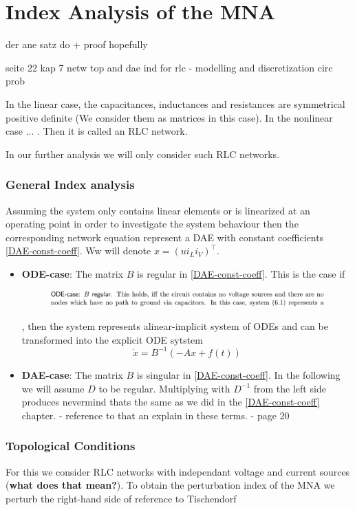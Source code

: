 \chapter{Index Analysis of the MNA}

der ane satz do + proof hopefully

seite 22 kap 7 netw top and dae ind for rlc - modelling and discretization circ prob

In the linear case, the capacitances, inductances and resistances are symmetrical positive definite (We consider them as matrices in this case). In the nonlinear case ... . Then it is called an RLC network.

In our further analysis we will only consider such RLC networks.

\subsection{General Index analysis}

Assuming the system only contains linear elements or is linearized at an operating point in order to investigate the system behaviour then the corresponding network equation represent a DAE with constant coefficients \ref{DAE-const-coeff}. Ww will denote $x=(u i_L i_V)^\top$.

\begin{itemize}
	\item \textbf{ODE-case}: \newline
	The matrix $B$ is regular in \ref{DAE-const-coeff}. This is the case if
	\begin{figure}[H]
		\centering
		\includegraphics[width=0.7\linewidth]{screenshot006}
		\caption{}
		\label{fig:screenshot006}
	\end{figure}
	, then the system represents  alinear-implicit system of ODEs and can be transformed into the explicit ODE sytstem
	\begin{displaymath}
		\dot{x}=B^{-1}(-Ax+f(t))
	\end{displaymath}
	
	\item \textbf{DAE-case}:
	The matrix $B$ is singular in \ref{DAE-const-coeff}. In the following we will assume $D$ to be regular. Multiplying with $D^{-1}$ from the left side produces
	\newline
	nevermind thats the same as we did in the \ref{DAE-const-coeff} chapter. - reference to that an explain in these terms. - page 20
\end{itemize}

\subsection{Topological Conditions}
For this we consider RLC networks with independant voltage and current sources (\textbf{what does that mean?}). To obtain the perturbation index of the MNA we perturb the right-hand side of  
\newline reference to Tischendorf